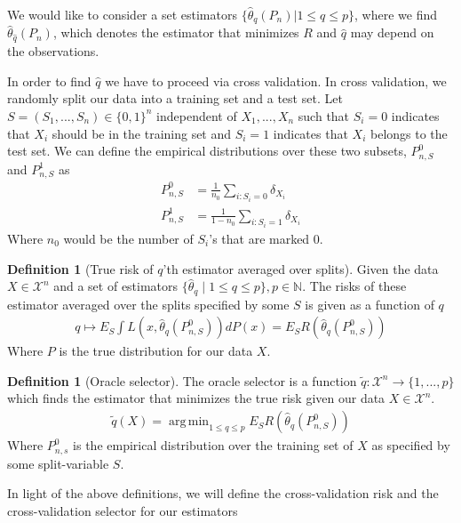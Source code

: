 \documentclass[11pt, a4paper]{article}
\DeclareMathOperator*{\argmin}{arg\,min}
\theoremstyle{definition}
\newtheorem{definition}[theorem]{Definition}
\theoremstyle{remark}
\newtheorem{example}{Example}
\newcommand{\cl}{q}
\begin{document}
%

We would like to consider a set estimators $ \{ \hat{\theta}_{\cl}(P_n) | 1 \leq \cl \leq p \} $, where we find $ \hat{\theta}_{ \hat{\cl} }(P_n) $, which denotes the estimator that minimizes $ R $ and $ \hat{\cl}  $ may depend on the observations. 

In order to find $ \hat{\cl}  $ we have to proceed via cross validation. In cross validation, we randomly split our data into a training set and a test set. Let $ S = (S_1,...,S_n) \in \{0,1\}^{n} $ independent of $ X_1,..., X_n $ such that $ S_i = 0 $ indicates that $ X_i $ should be in the training set and $ S_i = 1 $ indicates that $ X_i $ belongs to the test set. We can define the empirical distributions over these two subsets, $ P_{n,S}^0$ and $ P_{n,S}^{1} $ as
\begin{align*}
    P_{n,S}^{0} &= \frac{1}{n_0} \sum_{i: S_i = 0} \delta_{X_i} \\
    P_{n,S}^{1} &= \frac{1}{1-n_0} \sum_{i: S_i = 1} \delta_{X_i} 
\end{align*}
Where $ n_0 $ would be the number of $ S_i $'s that are marked $ 0 $. 

\begin{definition}[True risk of $ \cl $'th estimator averaged over splits]
    Given the data $ X \in \mathcal{X}^{n} $ and a set of estimators $ \{ \hat{\theta}_{\cl} \mid 1 \leq \cl \leq p \}, p \in \mathbb{N} $. The risks of these estimator averaged over the splits specified by some $ S $ is given as a function of $ \cl $ 
    \begin{align*}
        \cl \mapsto E_S \int L(x, \hat{\theta}_{\cl}(P_{n,S}^{0}) ) dP(x) = E_S R( \hat{\theta}_\cl(P_{n,S}^{0})) 
    \end{align*}
    Where $ P $ is the true distribution for our data $ X $.
\end{definition}

\begin{definition}[Oracle selector]
    The oracle selector is a function $ \tilde{\cl}: \mathcal{X}^{n} \to \{1,...,p\} $  which finds the estimator that minimizes the true risk given our data $ X \in \mathcal{X}^{n}$. 
    \begin{align*}
        \tilde{\cl}(X) = \argmin_{1 \leq \cl \leq p} E_S R( \hat{\theta} _\cl (P_{n,S}^0 )) 
    \end{align*}
    Where $ P_{n ,s}^{0} $ is the empirical distribution over the training set of $ X $ as specified by some split-variable $ S $. 
\end{definition}
In light of the above definitions, we will define the cross-validation risk and the cross-validation selector for our estimators
\end{document}
